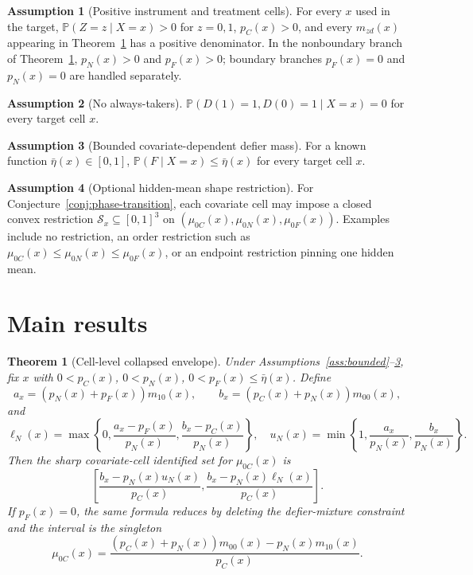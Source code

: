 \documentclass[11pt]{article}
\renewcommand{\Pr}{\mathbb{P}}
\theoremstyle{definition}
\newtheorem{assumption}{Assumption}
\theoremstyle{plain}
\newtheorem{theorem}{Theorem}
\theoremstyle{remark}
\begin{document}
\begin{assumption}[Positive instrument and treatment cells]\label{ass:positivity}
For every \(x\) used in the target, \(\Pr(Z=z\mid X=x)>0\) for \(z=0,1\), \(p_C(x)>0\), and every \(m_{zd}(x)\) appearing in Theorem~\ref{thm:cell-envelope} has a positive denominator.  In the nonboundary branch of Theorem~\ref{thm:cell-envelope}, \(p_N(x)>0\) and \(p_F(x)>0\); boundary branches \(p_F(x)=0\) and \(p_N(x)=0\) are handled separately.
\end{assumption}

\begin{assumption}[No always-takers]\label{ass:no-at}
\(\Pr(D(1)=1,D(0)=1\mid X=x)=0\) for every target cell \(x\).
\end{assumption}

\begin{assumption}[Bounded covariate-dependent defier mass]\label{ass:defier-cap}
For a known function \(\bar\eta(x)\in[0,1]\), \(\Pr(F\mid X=x)\le \bar\eta(x)\) for every target cell \(x\).
\end{assumption}

\begin{assumption}[Optional hidden-mean shape restriction]\label{ass:shape}
For Conjecture~\ref{conj:phase-transition}, each covariate cell may impose a closed convex restriction \(\mathcal{S}_x\subseteq[0,1]^3\) on \((\mu_{0C}(x),\mu_{0N}(x),\mu_{0F}(x))\).  Examples include no restriction, an order restriction such as \(\mu_{0C}(x)\le\mu_{0N}(x)\le\mu_{0F}(x)\), or an endpoint restriction pinning one hidden mean.
\end{assumption}

\section{Main results}
\begin{theorem}[Cell-level collapsed envelope]\label{thm:cell-envelope}
Under Assumptions~\ref{ass:bounded}--\ref{ass:defier-cap}, fix \(x\) with \(0<p_C(x)\), \(0<p_N(x)\), \(0<p_F(x)\le\bar\eta(x)\).  Define
\[
a_x=(p_N(x)+p_F(x))m_{10}(x),\qquad
b_x=(p_C(x)+p_N(x))m_{00}(x),
\]
and
\[
\ell_N(x)=\max\left\{0,\frac{a_x-p_F(x)}{p_N(x)},\frac{b_x-p_C(x)}{p_N(x)}\right\},
\quad
u_N(x)=\min\left\{1,\frac{a_x}{p_N(x)},\frac{b_x}{p_N(x)}\right\}.
\]
Then the sharp covariate-cell identified set for \(\mu_{0C}(x)\) is
\[
\left[
\frac{b_x-p_N(x)u_N(x)}{p_C(x)},
\frac{b_x-p_N(x)\ell_N(x)}{p_C(x)}
\right].
\]
If \(p_F(x)=0\), the same formula reduces by deleting the defier-mixture constraint and the interval is the singleton
\[
\mu_{0C}(x)=\frac{(p_C(x)+p_N(x))m_{00}(x)-p_N(x)m_{10}(x)}{p_C(x)}.
\]
\end{theorem}
\end{document}
